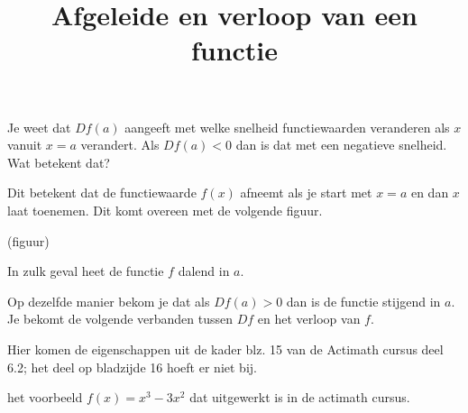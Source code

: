 \documentclass{article}
\title{Afgeleide en verloop van een functie}
\date { }
\begin{document}
\maketitle \noindent

\noindent Je weet dat $Df(a)$ aangeeft met welke snelheid functiewaarden veranderen als $x$ vanuit $x=a$ verandert.
Als $Df(a)<0$ dan is dat met een negatieve snelheid. Wat betekent dat?\vspace{5mm}

\noindent Dit betekent dat de functiewaarde $f(x)$ afneemt als je start met $x=a$ en dan $x$ laat toenemen.
Dit komt overeen met de volgende figuur.

(figuur)

\noindent In zulk geval heet de functie $f$ dalend in $a$.\vspace{5mm}

\noindent Op dezelfde manier bekom je dat als $Df(a)>0$ dan is de functie stijgend in $a$.
Je bekomt de volgende verbanden tussen $Df$ en het verloop van $f$.

\begin{eigenschap}
Hier komen de eigenschappen uit de kader blz. 15 van de Actimath cursus deel 6.2; het deel op bladzijde 16 hoeft er niet bij.
\end{eigenschap}

\begin{voorbeeld}
het voorbeeld $f(x)=x^3-3x^2$ dat uitgewerkt is in de actimath cursus.
\end{voorbeeld}
\end{document}
